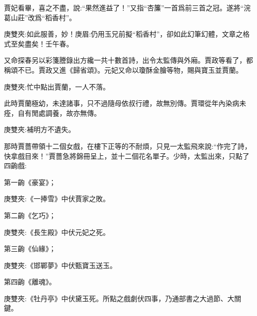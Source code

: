 \begin{parag}
    賈妃看畢，喜之不盡，說:“果然進益了！”又指“杏簾”一首爲前三首之冠。遂將“浣葛山莊”改爲“稻香村”。\begin{note}庚雙夾:如此服善，妙！庚眉:仍用玉兄前擬“稻香村”，卻如此幻筆幻體，文章之格式至矣盡矣！壬午春。\end{note}又命探春另以彩箋謄錄出方纔一共十數首詩，出令太監傳與外廂。賈政等看了，都稱頌不已。賈政又進《歸省頌》。元妃又命以瓊酥金膾等物，賜與寶玉並賈蘭。\begin{note}庚雙夾:忙中點出賈蘭，一人不落。\end{note}此時賈蘭極幼，未達諸事，只不過隨母依叔行禮，故無別傳。賈環從年內染病未痊，自有閒處調養，故亦無傳。\begin{note}庚雙夾:補明方不遺失。\end{note}
\end{parag}


\begin{parag}
    那時賈薔帶領十二個女戲，在樓下正等的不耐煩，只見一太監飛來說:“作完了詩，快拿戲目來！”賈薔急將錦冊呈上，並十二個花名單子。少時，太監出來，只點了四齣戲:
\end{parag}


\begin{parag}
    第一齣《豪宴》；\begin{note}庚雙夾:《一捧雪》中伏賈家之敗。\end{note}
\end{parag}


\begin{parag}
    第二齣《乞巧》；\begin{note}庚雙夾:《長生殿》中伏元妃之死。\end{note}
\end{parag}


\begin{parag}
    第三齣《仙緣》；\begin{note}庚雙夾:《邯鄲夢》中伏甄寶玉送玉。\end{note}
\end{parag}


\begin{parag}
    第四齣《離魂》。\begin{note}庚雙夾:《牡丹亭》中伏黛玉死。所點之戲劇伏四事，乃通部書之大過節、大關鍵。\end{note}
\end{parag}


